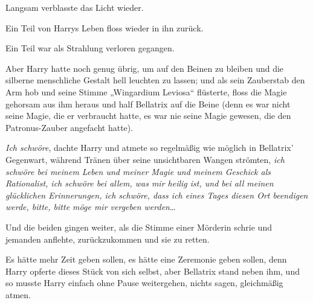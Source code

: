 Langsam verblasste das Licht wieder.

Ein Teil von Harrys Leben floss wieder in ihn zurück.

Ein Teil war als Strahlung verloren gegangen.

Aber Harry hatte noch genug übrig, um auf den Beinen zu bleiben und die silberne menschliche Gestalt hell leuchten zu lassen; und als sein Zauberstab den Arm hob und seine Stimme „Wingardium Leviosa“ flüsterte, floss die Magie gehorsam aus ihm heraus und half Bellatrix auf die Beine (denn es war nicht seine Magie, die er verbraucht hatte, es war nie seine Magie gewesen, die den Patronus-Zauber angefacht hatte).

\emph{Ich schwöre}, dachte Harry und atmete so regelmäßig wie möglich in Bellatrix' Gegenwart, während Tränen über seine unsichtbaren Wangen strömten, \emph{ich schwöre bei meinem Leben und meiner Magie und meinem Geschick als Rationalist, ich schwöre bei allem, was mir heilig ist, und bei all meinen glücklichen Erinnerungen, ich schwöre, dass ich eines Tages diesen Ort beendigen werde, bitte, bitte möge mir vergeben werden}…

Und die beiden gingen weiter, als die Stimme einer Mörderin schrie und jemanden anflehte, zurückzukommen und sie zu retten.

Es hätte mehr Zeit geben sollen, es hätte eine Zeremonie geben sollen, denn Harry opferte dieses Stück von sich selbst, aber Bellatrix stand neben ihm, und so musste Harry einfach ohne Pause weitergehen, nichts sagen, gleichmäßig atmen.

